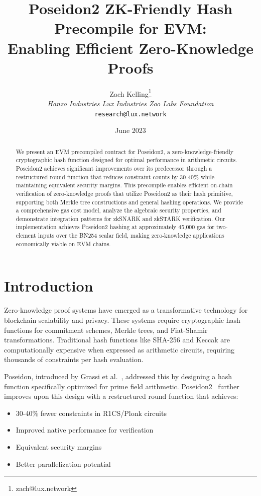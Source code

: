 \documentclass[11pt,a4paper]{article}
\title{Poseidon2 ZK-Friendly Hash Precompile for EVM:\\Enabling Efficient Zero-Knowledge Proofs}
\author{Zach Kelling\thanks{zach@lux.network} \\ \textit{Hanzo Industries \quad Lux Industries \quad Zoo Labs Foundation} \\ \texttt{research@lux.network}}
\date{June 2023}
\begin{document}
\maketitle

\begin{abstract}
We present an EVM precompiled contract for Poseidon2, a zero-knowledge-friendly cryptographic hash function designed for optimal performance in arithmetic circuits. Poseidon2 achieves significant improvements over its predecessor through a restructured round function that reduces constraint counts by 30-40\% while maintaining equivalent security margins. This precompile enables efficient on-chain verification of zero-knowledge proofs that utilize Poseidon2 as their hash primitive, supporting both Merkle tree constructions and general hashing operations. We provide a comprehensive gas cost model, analyze the algebraic security properties, and demonstrate integration patterns for zkSNARK and zkSTARK verification. Our implementation achieves Poseidon2 hashing at approximately 45,000 gas for two-element inputs over the BN254 scalar field, making zero-knowledge applications economically viable on EVM chains.
\end{abstract}

\section{Introduction}

Zero-knowledge proof systems have emerged as a transformative technology for blockchain scalability and privacy. These systems require cryptographic hash functions for commitment schemes, Merkle trees, and Fiat-Shamir transformations. Traditional hash functions like SHA-256 and Keccak are computationally expensive when expressed as arithmetic circuits, requiring thousands of constraints per hash evaluation.

Poseidon, introduced by Grassi et al.~\cite{poseidon}, addressed this by designing a hash function specifically optimized for prime field arithmetic. Poseidon2~\cite{poseidon2} further improves upon this design with a restructured round function that achieves:

\begin{itemize}
    \item 30-40\% fewer constraints in R1CS/Plonk circuits
    \item Improved native performance for verification
    \item Equivalent security margins
    \item Better parallelization potential
\end{itemize}
\end{document}
